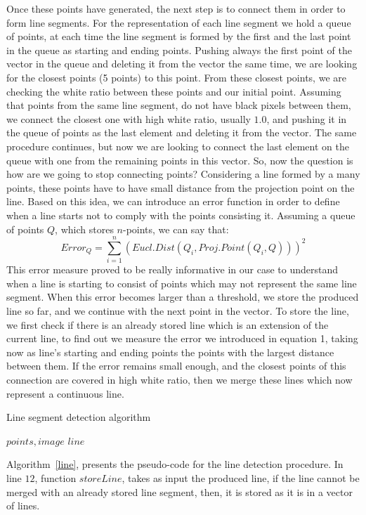 \documentclass[	DIV=calc,%
							paper=a4,%
							fontsize=11pt,%
							twocolumn]{scrartcl}	 					%
\begin{document}
Once these points have generated, the next step is to connect them in order to form line segments. For the representation of each line segment we hold a queue of points, at each time the line segment is formed by the first and the last point in the queue as starting and ending points. Pushing always the first point of the vector in the queue and deleting it from the vector the same time, we are looking for the closest points (5 points) to this point. From these closest points, we are checking the white ratio between these points and our initial point. Assuming that points from the same line segment, do not have black pixels between them, we connect the closest one with high white ratio, usually $1.0$, and pushing it in the queue of points as the last element and deleting it from the vector. The same procedure continues, but now we are looking to connect the last element on the queue with one from the remaining points in this vector. So, now the question is how are we going to stop connecting points? Considering a line formed by a many points, these points have to have small distance from the projection point on the line. Based on this idea, we can introduce an error function in order to define when a line starts not to comply with the points consisting it. Assuming a queue of points $Q$, which stores $n$-points, we can say that:
\begin{equation}
Error_Q = \sum_{i=1}^{n}(Eucl.Dist(Q_i, Proj.Point(Q_i,Q)))^2
\end{equation}
This error measure proved to be really informative in our case to understand when a line is starting to consist of points which may not represent the same line segment. When this error becomes larger than a threshold, we store the produced line so far, and we continue with the next point in the vector. To store the line, we first check if there is an already stored line which is an extension of the current line, to find out we measure the error we introduced in equation 1, taking now as line's starting and ending points the points with the largest distance between them. If the error remains small enough, and the closest points of this connection are covered in high white ratio, then we merge these lines which now represent a continuous line. 
\begin{algorithm}[t!]
\caption{Line segment detection algorithm}
\label{line}
\begin{algorithmic}[1]
$points, image$
$line$
\ELSE
{}
\ENDIF
\ENDWHILE
\end{algorithmic}
\end{algorithm}
Algorithm~\ref{line}, presents the pseudo-code for the line detection procedure. In line $12$, function $storeLine$, takes as input the produced line, if the line cannot be merged with an already stored line segment, then, it is stored as it is in a vector of lines.
\end{document}
